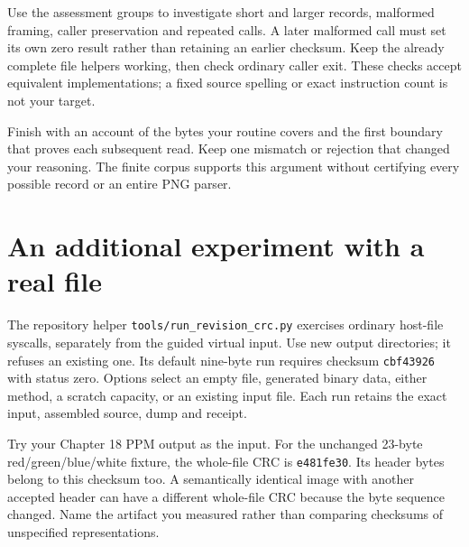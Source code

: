 Use the assessment groups to investigate short and larger records, malformed
framing, caller preservation and repeated calls. A later malformed call must
set its own zero result rather than retaining an earlier checksum. Keep the
already complete file helpers working, then check ordinary caller exit. These
checks accept equivalent implementations; a fixed source spelling or exact
instruction count is not your target.

Finish with an account of the bytes your routine covers and the first boundary
that proves each subsequent read. Keep one mismatch or rejection that changed
your reasoning. The finite corpus supports this argument without certifying
every possible record or an entire PNG parser.

\section{An additional experiment with a real file}

The repository helper \texttt{tools/\allowbreak run\_revision\_crc.py} exercises
ordinary host-file syscalls, separately from the guided virtual input. Use new
output directories; it refuses an existing one. Its default nine-byte run
requires checksum \texttt{cbf43926} with status zero. Options select an empty
file, generated binary data, either method, a scratch capacity, or an existing
input file. Each run retains the exact input, assembled source, dump and receipt.

Try your Chapter 18 PPM output as the input. For the unchanged 23-byte
red/green/blue/white fixture, the whole-file CRC is \texttt{e481fe30}. Its header
bytes belong to this checksum too. A semantically identical image with another
accepted header can have a different whole-file CRC because the byte sequence
changed. Name the artifact you measured rather than comparing checksums of
unspecified representations.
